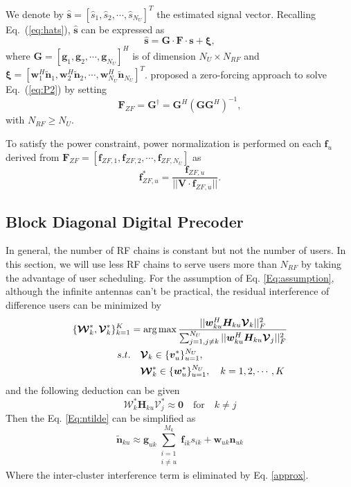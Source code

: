 \documentclass[conference]{IEEEtran}
\def\argmax{\mathop{\mbox{arg\,max}}}
\begin{document}
We denote by $\hat{\bm s}=\left[\hat{s}_1,\hat{s}_2,\cdots,\hat{s}_{N_U}\right]^T$ the estimated signal vector. Recalling Eq.~(\ref{eq:hats}), $\hat{\bm s}$ can be expressed as \cite{alkhateeb2014channel}
\begin{equation}\label{eq:hatsAllUsers}
\hat{\bm s} = {\bm G}\cdot \bm{F} \cdot\bm{s} + \bm{\xi},
\end{equation}
where ${\bm G}=\left[{\bm g}_1,{\bm g}_2,\cdots,{\bm g}_{N_U}\right]^H$ is of dimension $N_U\times N_{RF}$ and ${\bm \xi}=\left[{\bm w}_1^H\tilde{\bm n}_1,{\bm w}_2^H\tilde{\bm n}_2,\cdots,{\bm w}_{N_U}^H\tilde{\bm n}_{N_U}\right]^T$. \cite{alkhateeb2014channel} proposed a zero-forcing approach to solve Eq.~(\ref{eq:P2}) by setting
\begin{equation}\label{eq:ZFU-HBF}
\bm{F}_{ZF}={\bm G}^\dagger = \bm{G}^H(\bm{G}\bm{G}^H)^{-1},
\end{equation}
with $N_{RF}\geq N_U$.

To satisfy the power constraint, power normalization is performed on each ${\bm f}_u$ derived from $\bm{F}_{ZF}=\left[\bm{f}_{ZF,1},\bm{f}_{ZF,2},\cdots,\bm{f}_{ZF,N_U}\right]$ as
\begin{equation}\label{eq:ZFU-HBF2}
\bm{f}^*_{ZF,u} = {\frac{\bm{f}_{ZF,u}}{||\bm{V}\cdot\bm{f}_{ZF,u}||}}.
\end{equation}

\subsection{Block Diagonal Digital Precoder}
In general, the number of RF chains is constant but not the number of users. In this section, we will use less RF chains to serve users more than $N_{RF}$ by taking the advantage of user scheduling. For the assumption of Eq. \eqref{Eq:assumption},  although the infinite antennas can't be practical, the residual interference of difference users can be minimized by
\begin{align}\label{eq:group-scheduling}
\{\bm{\mathcal{W}}^*_k, \bm{\mathcal{V}}^*_k\}_{k=1}^{K} &= \argmax \frac{||\bm{w}^H_{ku} \bm{H}_{ku} \bm{\mathcal{V}}_k||_F^2}{\sum_{j=1,j\neq k}^{N_U}||\bm{w}^H_{ku} \bm{H}_{ku} \bm{\mathcal{V}}_j||_F^2}  \\ \nonumber
s.t. &\quad \bm{\mathcal{V}}_{k} \in  \{\bm{v}_u^*\}_{u=1}^{N_U}, \\
&\quad \bm{\mathcal{W}}^*_k \in \{\bm{w}^*_u\}_{u=1}^{N_U},\quad k = 1,2,\cdots,K
\end{align}
and the following deduction can be given
\begin{equation}\label{approx}
\bm{\mathcal{W}}^*_{k}\bm{H}_{ku}\bm{\mathcal{V}}^*_{j} \approx \bm{0} \quad \text{for} \quad k \neq j
\end{equation}
Then the Eq. \eqref{Eq:ntilde} can be simplified as 
\begin{equation}
\tilde{\bm{n}}_{ku} \approx	\bm{g}_{uk}\sum_{\substack{i=1\\i\neq u}}^{M_k}\bm{f}_{ik}s_{ik}+\bm{w}_{uk}\bm{n}_{uk}
\end{equation}
Where the inter-cluster interference term is eliminated by Eq. \eqref{approx}. 
\end{document}
